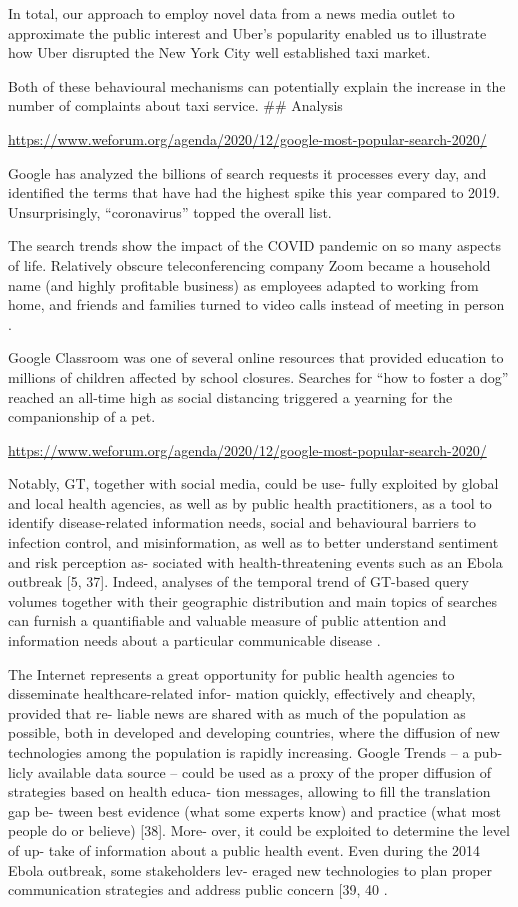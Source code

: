 \documentclass[11pt,a4paper,]{article}
\begin{document}
In total, our approach to employ novel data from a news media outlet to approximate the public interest and Uber's popularity enabled us to illustrate how Uber disrupted the New York City well established taxi market.

Both of these behavioural mechanisms can potentially explain the increase in the number of complaints about taxi service.
\#\# Analysis

\url{https://www.weforum.org/agenda/2020/12/google-most-popular-search-2020/}

Google has analyzed the billions of search requests it processes every day, and identified the terms that have had the highest spike this year compared to 2019. Unsurprisingly, ``coronavirus'' topped the overall list.

The search trends show the impact of the COVID pandemic on so many aspects of life. Relatively obscure teleconferencing company Zoom became a household name (and highly profitable business) as employees adapted to working from home, and friends and families turned to video calls instead of meeting in person .

Google Classroom was one of several online resources that provided education to millions of children affected by school closures. Searches for ``how to foster a dog'' reached an all-time high as social distancing triggered a yearning for the companionship of a pet.

\url{https://www.weforum.org/agenda/2020/12/google-most-popular-search-2020/}

Notably, GT, together with social media, could be use- fully exploited by global and local health agencies, as well as by public health practitioners, as a tool to identify disease-related information needs, social and behavioural barriers to infection control, and misinformation, as well as to better understand sentiment and risk perception as- sociated with health-threatening events such as an Ebola outbreak {[}5, 37{]}. Indeed, analyses of the temporal trend of GT-based query volumes together with their geographic distribution and main topics of searches can furnish a quantifiable and valuable measure of public attention and information needs about a particular communicable disease \autocite{alicino2015assessing}.

The Internet represents a great opportunity for public health agencies to disseminate healthcare-related infor- mation quickly, effectively and cheaply, provided that re- liable news are shared with as much of the population as possible, both in developed and developing countries, where the diffusion of new technologies among the population is rapidly increasing. Google Trends -- a pub- licly available data source -- could be used as a proxy of the proper diffusion of strategies based on health educa- tion messages, allowing to fill the translation gap be- tween best evidence (what some experts know) and practice (what most people do or believe) {[}38{]}. More- over, it could be exploited to determine the level of up- take of information about a public health event. Even during the 2014 Ebola outbreak, some stakeholders lev- eraged new technologies to plan proper communication strategies and address public concern {[}39, 40 \autocite{alicino2015assessing}.
\end{document}
